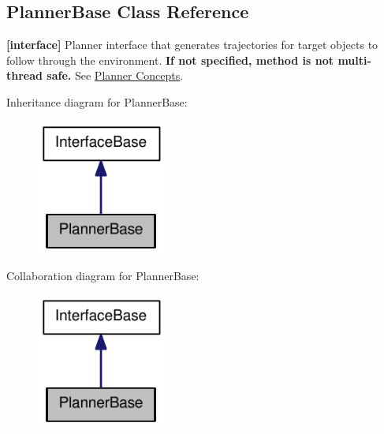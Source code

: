 \hypertarget{classOpenRAVE_1_1PlannerBase}{
\subsection{PlannerBase Class Reference}
\label{classOpenRAVE_1_1PlannerBase}
}


{\bfseries \mbox{[}interface\mbox{]}} Planner interface that generates trajectories for target objects to follow through the environment. {\bfseries If not specified, method is not multi-\/thread safe.} See \hyperlink{arch__planner}{Planner Concepts}.  




Inheritance diagram for PlannerBase:\nopagebreak
\begin{figure}[H]
\begin{center}
\leavevmode
\includegraphics[width=120pt]{classOpenRAVE_1_1PlannerBase__inherit__graph}
\end{center}
\end{figure}


Collaboration diagram for PlannerBase:\nopagebreak
\begin{figure}[H]
\begin{center}
\leavevmode
\includegraphics[width=120pt]{classOpenRAVE_1_1PlannerBase__coll__graph}
\end{center}
\end{figure}
